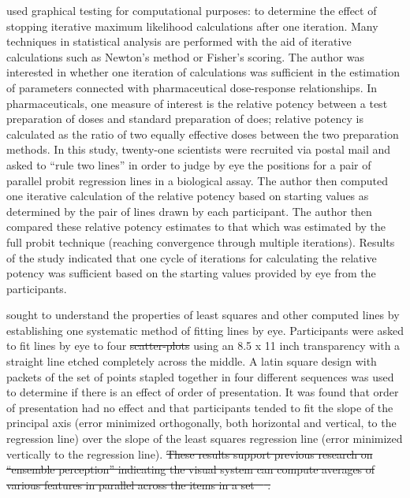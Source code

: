 \documentclass[12pt]{article}
\providecommand{\DIFaddtex}[1]{{\protect\color{blue}\uwave{#1}}} %
\providecommand{\DIFdeltex}[1]{{\protect\color{red}\sout{#1}}}                      %
\providecommand{\DIFaddbegin}{} %
\providecommand{\DIFaddend}{} %
\providecommand{\DIFdelbegin}{} %
\providecommand{\DIFdelend}{} %
\providecommand{\DIFadd}[1]{\texorpdfstring{\DIFaddtex{#1}}{#1}} %
\providecommand{\DIFdel}[1]{\texorpdfstring{\DIFdeltex{#1}}{}} %
\newcommand{\DIFscaledelfig}{0.5}
\newlength{\DIFdelgraphicswidth} %
\newlength{\DIFdelgraphicsheight} %
\newcommand{\DIFaddincludegraphics}[2][]{{\color{blue}\fbox{\DIFOincludegraphics[#1]{#2}}}} %
\newcommand{\DIFdelincludegraphics}[2][]{%
\sbox{\DIFdelgraphicsbox}{\DIFOincludegraphics[#1]{#2}}%
\settoboxwidth{\DIFdelgraphicswidth}{\DIFdelgraphicsbox} %
\settoboxtotalheight{\DIFdelgraphicsheight}{\DIFdelgraphicsbox} %
\scalebox{\DIFscaledelfig}{%
\parbox[b]{\DIFdelgraphicswidth}{\usebox{\DIFdelgraphicsbox}\\[-\baselineskip] \rule{\DIFdelgraphicswidth}{0em}}\llap{\resizebox{\DIFdelgraphicswidth}{\DIFdelgraphicsheight}{%
\setlength{\unitlength}{\DIFdelgraphicswidth}%
\begin{picture}(1,1)%
\thicklines\linethickness{2pt} %
{\color[rgb]{1,0,0}\put(0,0){\framebox(1,1){}}}%
{\color[rgb]{1,0,0}\put(0,0){\line( 1,1){1}}}%
{\color[rgb]{1,0,0}\put(0,1){\line(1,-1){1}}}%
\end{picture}%
}\hspace*{3pt}}} %
} %
\DeclareRobustCommand{\DIFaddbegin}{\DIFOaddbegin \let\includegraphics\DIFaddincludegraphics} %
\DeclareRobustCommand{\DIFaddend}{\DIFOaddend \let\includegraphics\DIFOincludegraphics} %
\DeclareRobustCommand{\DIFdelbegin}{\DIFOdelbegin \let\includegraphics\DIFdelincludegraphics} %
\DeclareRobustCommand{\DIFdelend}{\DIFOaddend \let\includegraphics\DIFOincludegraphics} %
\begin{document}
\citet{finney1951subjective} used graphical testing for computational
purposes: to determine the effect of stopping iterative maximum
likelihood calculations after one iteration. Many techniques in
statistical analysis are performed with the aid of iterative
calculations such as Newton's method or Fisher's scoring. The author was
interested in whether one iteration of calculations was sufficient in
the estimation of parameters connected with pharmaceutical dose-response
relationships. In pharmaceuticals, one measure of interest is the
relative potency between a test preparation of doses and standard
preparation of does; relative potency is calculated as the ratio of two
equally effective doses between the two preparation methods. In this
study, twenty-one scientists were recruited via postal mail and asked to
``rule two lines'' in order to judge by eye the positions for a pair of
parallel probit regression lines in a biological assay. The author then
computed one iterative calculation of the relative potency based on
starting values as determined by the pair of lines drawn by each
participant. The author then compared these relative potency estimates
to that which was estimated by the full probit technique (reaching
convergence through multiple iterations). Results of the study indicated
that one cycle of iterations for calculating the relative potency was
sufficient based on the starting values provided by eye from the
participants.

\citet{mosteller1981eye} sought to understand the properties of least
squares and other computed lines by establishing one systematic method
of fitting lines by eye. Participants were asked to fit lines by eye to
four \DIFdelbegin \DIFdel{scatter-plots }\DIFdelend \DIFaddbegin \DIFadd{scatterplots }\DIFaddend using an 8.5 x 11 inch transparency with a straight
line etched completely across the middle. A latin square design with
packets of the set of points stapled together in four different
sequences was used to determine if there is an effect of order of
presentation. It was found that order of presentation had no effect and
that participants tended to fit the slope of the principal axis (\DIFaddbegin \DIFadd{PA)
(}\DIFaddend error minimized orthogonally, both horizontal and vertical, to the
regression line) over the slope of the least squares regression line
(error minimized vertically to the regression line).
\DIFdelbegin \DIFdel{These results support
previous research on ``ensemble perception'' indicating the visual
system can compute averages of various features in parallel across the
items in a set
\mbox{%
\citep{chong2003representation, chong2005statistical, van2011rapid}}\hspace{0pt}%
.
}\DIFdelend 
\end{document}
